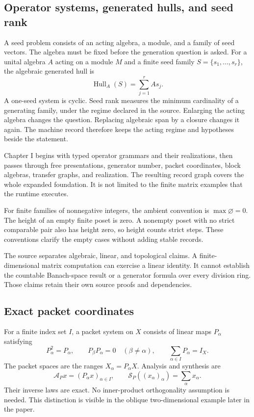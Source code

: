 \documentclass[a4paper,11pt]{article}
\newcommand{\Hull}{\operatorname{Hull}}\newcommand{\srank}{\operatorname{srank}}\newcommand{\psrank}{\operatorname{psrank}}\newcommand{\End}{\operatorname{End}}\newcommand{\Hom}{\operatorname{Hom}}\newcommand{\im}{\operatorname{im}}\newcommand{\Ker}{\operatorname{Ker}}\newcommand{\Jac}{\operatorname{Jac}}\newcommand{\Irr}{\operatorname{Irr}}\newcommand{\Span}{\operatorname{span}}\newcommand{\alg}{\operatorname{alg}}\newcommand{\Reach}{\operatorname{Reach}}\newcommand{\Supp}{\operatorname{Supp}}\newcommand{\id}{\mathrm{id}}\newcommand{\cl}[1]{\overline{#1}}
\begin{document}
\subsection{Operator systems, generated hulls, and seed rank}
A seed problem consists of an acting algebra, a module, and a family of seed vectors. The algebra must be fixed before the generation question is asked. For a unital algebra $A$ acting on a module $M$ and a finite seed family $S=\{s_1,\ldots,s_r\}$, the algebraic generated hull is
\[
\Hull_A(S)=\sum_{j=1}^{r}As_j.
\]
A one-seed system is cyclic. Seed rank measures the minimum cardinality of a generating family, under the regime declared in the source. Enlarging the acting algebra changes the question. Replacing algebraic span by a closure changes it again. The machine record therefore keeps the acting regime and hypotheses beside the statement.

Chapter I begins with typed operator grammars and their realizations, then passes through free presentations, generator number, packet coordinates, block algebras, transfer graphs, and realization. The resulting record graph covers the whole expanded foundation. It is not limited to the finite matrix examples that the runtime executes.

For finite families of nonnegative integers, the ambient convention is $\max\varnothing=0$. The height of an empty finite poset is zero. A nonempty poset with no strict comparable pair also has height zero, so height counts strict steps. These conventions clarify the empty cases without adding stable records.

The source separates algebraic, linear, and topological claims. A finite-dimensional matrix computation can exercise a linear identity. It cannot establish the countable Banach-space result or a generator formula over every division ring. Those claims retain their own source proofs and dependencies.
\subsection{Exact packet coordinates}
For a finite index set $I$, a packet system on $X$ consists of linear maps $P_\alpha$ satisfying
\[
P_\alpha^2=P_\alpha,\qquad
P_\beta P_\alpha=0\quad(\beta\ne\alpha),\qquad
\sum_{\alpha\in I}P_\alpha=I_X.
\]
The packet spaces are the ranges $X_\alpha=P_\alpha X$. Analysis and synthesis are
\[
\mathcal A_Px=(P_\alpha x)_{\alpha\in I},\qquad
\mathcal S_P((x_\alpha)_\alpha)=\sum_\alpha x_\alpha.
\]
Their inverse laws are exact. No inner-product orthogonality assumption is needed. This distinction is visible in the oblique two-dimensional example later in the paper.
\end{document}
